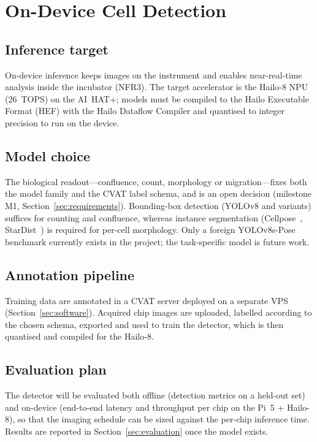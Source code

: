 \section{On-Device Cell Detection}
\label{sec:edgeai}

\subsection{Inference target}
On-device inference keeps images on the instrument and enables near-real-time
analysis inside the incubator (NFR3). The target accelerator is the Hailo-8 NPU
(\SI{26}{TOPS}) on the AI~HAT+; models must be compiled to the Hailo Executable
Format (HEF) with the Hailo Dataflow Compiler and quantised to integer
precision to run on the device.

\subsection{Model choice}
The biological readout---confluence, count, morphology or migration---fixes both
the model family and the CVAT label schema, and is an open decision (milestone
M1, Section~\ref{sec:requirements}). Bounding-box detection (YOLOv8 and
variants) suffices for counting and confluence, whereas instance segmentation
(Cellpose~\cite{Stringer2021Cellpose}, StarDist~\cite{Schmidt2018StarDist})
is required for per-cell morphology. Only a foreign YOLOv8s-Pose benchmark
currently exists in the project; the task-specific model is future work.

\subsection{Annotation pipeline}
Training data are annotated in a CVAT server deployed on a separate VPS
(Section~\ref{sec:software}). Acquired chip images are uploaded, labelled
according to the chosen schema, exported and used to train the detector, which
is then quantised and compiled for the Hailo-8. 

\subsection{Evaluation plan}
The detector will be evaluated both offline (detection metrics on a held-out
set) and on-device (end-to-end latency and throughput per chip on the Pi~5 +
Hailo-8), so that the imaging schedule can be sized against the per-chip
inference time. Results are reported in Section~\ref{sec:evaluation} once the
model exists.
